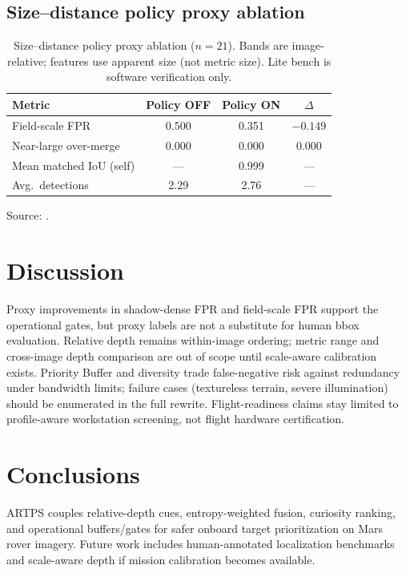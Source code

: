 \documentclass[10pt,twocolumn,letterpaper]{article}
\begin{document}
\subsection{Size--distance policy proxy ablation}
\begin{table}[t]
\centering
\caption{Size--distance policy proxy ablation ($n{=}21$).
Bands are image-relative; features use apparent size (not metric size).
Lite bench is software verification only.}
\label{tab:size-distance-proxy}
\small
\begin{tabular}{@{}lccc@{}}
\toprule
Metric & Policy OFF & Policy ON & $\Delta$ \\
\midrule
Field-scale FPR & 0.500 & 0.351 & $-0.149$ \\
Near-large over-merge & 0.000 & 0.000 & $0.000$ \\
Mean matched IoU (self) & --- & 0.999 & --- \\
Avg.\ detections & 2.29 & 2.76 & --- \\
\bottomrule
\end{tabular}
\end{table}
Source: .

\section{Discussion}
Proxy improvements in shadow-dense FPR and field-scale FPR support the operational gates,
but proxy labels are not a substitute for human bbox evaluation.
Relative depth remains within-image ordering; metric range and cross-image depth comparison
are out of scope until scale-aware calibration exists.
Priority Buffer and diversity trade false-negative risk against redundancy under bandwidth
limits; failure cases (textureless terrain, severe illumination) should be enumerated in the
full rewrite.
Flight-readiness claims stay limited to profile-aware workstation screening, not flight
hardware certification.

\section{Conclusions}
ARTPS couples relative-depth cues, entropy-weighted fusion, curiosity ranking, and
operational buffers/gates for safer onboard target prioritization on Mars rover imagery.
Future work includes human-annotated localization benchmarks and scale-aware depth if
mission calibration becomes available.



\end{document}
